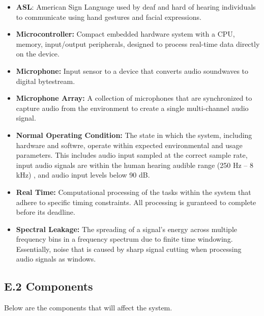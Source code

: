 \documentclass[12pt]{article}
\theoremstyle{definition}
\begin{document}
\begin{itemize}

  \item \textbf{ASL}: American Sign Language used by deaf and hard of hearing
  individuals to communicate using hand gestures and facial expressions.

  \item \textbf{Microcontroller:}\label{def:microcontroller} Compact embedded
  hardware system with a CPU, memory, input/output peripherals, designed to
  process real-time data directly on the device.

  \item \textbf{Microphone:}\label{def:microphone} Input sensor to a device that
  converts audio soundwaves to digital bytestream.

  \item \textbf{Microphone Array:}\label{def:microphone_array} A collection of
  microphones that are synchronized to capture audio from the environment to
  create a single multi-channel audio signal.

  \item \textbf{Normal Operating Condition:}
  \label{def:normal_operation_condition} The state in which the system,
  including hardware and softwre, operate within expected environmental and
  usage parameters. This includes audio input sampled at the correct sample
  rate, input audio signals are within the human hearing audible range
  (250 Hz – 8 kHz) \cite{MiracleEar2025}, and audio input levels below 90 dB.

  \item \textbf{Real Time:} \label{def:real_time} Computational processing of
  the tasks within the system that adhere to specific timing constraints.
  All processing is guranteed to complete before its deadline.

  \item \textbf{Spectral Leakage:} \label{def:spectral_leakage} The spreading of
  a signal's energy across multiple frequency bins in a frequency spectrum due
  to finite time windowing. Essentially, noise that is caused by sharp signal
  cutting when processing audio signals as windows.

\end{itemize}

\subsection{E.2 Components}

Below are the components that will affect the system.
\end{document}

